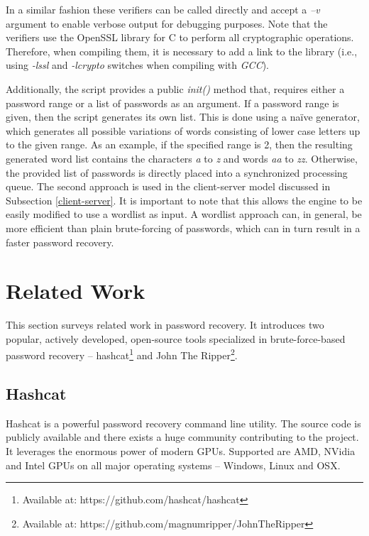 \documentclass[11pt,oneside]{fithesis2}
\begin{document}
In a similar fashion these verifiers can be called directly and accept a \textit{–v} argument to enable verbose output for debugging purposes. Note that the verifiers use the OpenSSL library for C \cite{openssl} to perform all cryptographic operations. Therefore, when compiling them, it is necessary to add a link to the library (i.e., using \textit{-lssl} and \textit{-lcrypto} switches when compiling with \textit{GCC}).

Additionally, the script provides a public \textit{init()} method that, requires either a password range or a list of passwords as an argument. If a password range is given, then the script generates its own list. This is done using a naïve generator, which generates all possible variations of words consisting of lower case letters up to the given range. As an example, if the specified range is 2, then the resulting generated word list contains the characters \textit{a} to \textit{z} and words \textit{aa} to \textit{zz}. Otherwise, the provided list of passwords is directly placed into a synchronized processing queue. The second approach is used in the client-server model discussed in Subsection \ref{client-server}. It is important to note that this allows the engine to be easily modified to use a wordlist as input. A wordlist approach can, in general, be more efficient than plain brute-forcing of passwords, which can in turn result in a faster password recovery.

\section{Related Work}\label{related_work}

This section surveys related work in password recovery. It introduces two popular, actively developed, open-source tools specialized in brute-force-based password recovery -- hashcat\footnote{Available at: https://github.com/hashcat/hashcat} and John The Ripper\footnote{Available at: https://github.com/magnumripper/JohnTheRipper}.

\subsection{Hashcat}

Hashcat is a powerful password recovery command line utility. The source code is publicly available and there exists a huge community contributing to the project. It leverages the enormous power of modern GPUs. Supported are AMD, NVidia and Intel GPUs on all major operating systems -- Windows, Linux and OSX.
\end{document}

